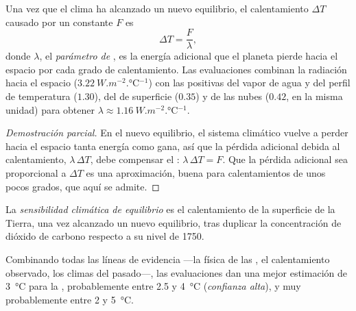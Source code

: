 \begin{proposition}\label{prop:g12:climate-change:equilibrium}
Una vez que el clima ha alcanzado un nuevo equilibrio, el calentamiento $\Delta T$ causado por
un  constante $F$ es
\[
  \Delta T = \frac{F}{\lambda},
\]
donde $\lambda$, el \emph{parámetro de }, es la energía adicional
que el planeta pierde hacia el espacio por cada grado de calentamiento. Las evaluaciones
combinan la radiación hacia el espacio ($\qty{3.22}{W.m^{-2}.\degreeCelsius^{-1}}$)
con las  positivas del vapor de agua y del perfil de temperatura
($1.30$), del  de superficie ($0.35$) y de las nubes ($0.42$, en la misma
unidad) para obtener $\lambda \approx \qty{1.16}{W.m^{-2}.\degreeCelsius^{-1}}$.
\end{proposition}

\begin{proof}[Demostración parcial]
En el nuevo equilibrio, el sistema climático vuelve a perder hacia el espacio tanta energía
como gana, así que la pérdida adicional debida al calentamiento, $\lambda\,\Delta T$, debe
compensar el : $\lambda\,\Delta T = F$. Que la pérdida adicional sea
proporcional a $\Delta T$ es una aproximación, buena para calentamientos de unos pocos
grados, que aquí se admite.
\end{proof}

\begin{definition}\label{def:g12:climate-change:ecs}
La \emph{sensibilidad climática de equilibrio}
es el calentamiento de la superficie de la Tierra, una vez alcanzado un nuevo equilibrio, tras
duplicar la concentración de dióxido de carbono respecto a su nivel de 1750.
\end{definition}

\begin{proposition}\label{prop:g12:climate-change:ecs}
Combinando todas las líneas de evidencia ---la física de las , el
calentamiento observado, los climas del pasado---, las evaluaciones dan una mejor estimación
de \qty{3}{\degreeCelsius} para la , probablemente
entre 2.5 y \qty{4}{\degreeCelsius} (\emph{confianza alta}), y muy
probablemente entre 2 y \qty{5}{\degreeCelsius}.
\end{proposition}

